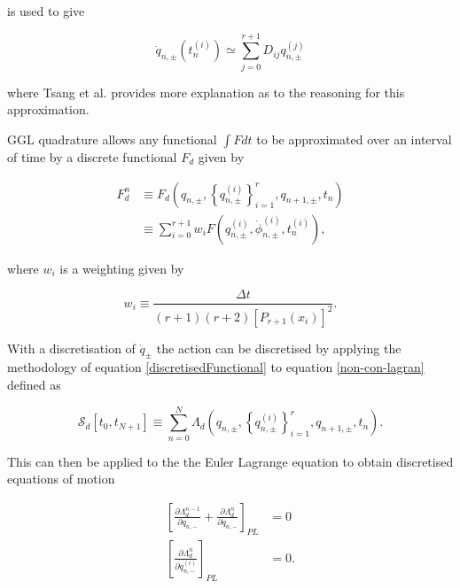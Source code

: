 \documentclass[10pt]{iopart}
\begin{document}
is used to give

\begin{equation}
	\dot{q}_{n,\pm}(t_n^{(i)}) \simeq \sum_{j=0}^{r+1} D_{ij}q_{n,\pm}^{(j)}
\end{equation}

where Tsang et al. \cite{Tsang_Slimplectic} provides more explanation as to the reasoning for this approximation.

 GGL quadrature allows any functional $\int F dt$ to be approximated over an interval of time by a discrete functional $F_d$ given by
 
\begin{equation}
\label{discretisedFunctional}
\begin{aligned}
F_d^n &\equiv F_d\left(q_{n, \pm},\left\{q_{n, \pm}^{(i)}\right\}_{i=1}^r, q_{n+1, \pm}, t_n\right) \\  &\equiv \sum_{i=0}^{r+1} w_i F\left(q_{n, \pm}^{(i)}, \dot{\phi}_{n, \pm}^{(i)}, t_n^{(i)}\right),
\end{aligned}
\end{equation}

where $w_i$ is a weighting given by 

\begin{equation}
	w_i \equiv \frac{\Delta t}{(r+1)(r+2)[P_{r+1}(x_i)]^2}.
\end{equation}

With a discretisation of $\dot{q}_{\pm}$ the action can be discretised by applying the methodology of equation \ref{discretisedFunctional} to equation \ref{non-con-lagran} defined as 


\begin{equation}
\mathcal{S}_d\left[t_0, t_{N+1}\right] \equiv \sum_{n=0}^N \Lambda_d\left(q_{n, \pm},\left\{q_{n, \pm}^{(i)}\right\}_{i=1}^r, q_{n+1, \pm}, t_n\right).
\end{equation}

This can then be applied to the the Euler Lagrange equation to obtain discretised equations of motion


\begin{subequations}
\label{positionEoM}
\begin{align}
		\left[\frac{\partial \Lambda_d^{n-1}}{\partial q_{n,-}} + \frac{\partial\Lambda_d^n}{\partial q_{n,-}}\right]_{PL} &= 0 \\
	\left[\frac{\partial\Lambda_d^n}{\partial q_{n,-}^{(i)}}\right]_{PL} &= 0.
\end{align}
\end{subequations}
\end{document}
